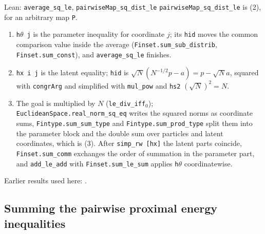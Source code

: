 \documentclass[11pt,a4paper]{report}
\begin{document}
\begin{leanbox}{Lean: \texttt{average\_\allowbreak{}sq\_\allowbreak{}le}, \texttt{pairwiseMap\_\allowbreak{}sq\_\allowbreak{}dist\_\allowbreak{}le}}
\texttt{pairwise\allowbreak{}Map\_\allowbreak{}sq\_\allowbreak{}dist\_\allowbreak{}le} is (2), for an arbitrary map \texttt{P}.



\begin{enumerate}


\item \texttt{h\ensuremath{\theta} j} is the parameter inequality for coordinate \(j\); its \texttt{hid} moves the common comparison value inside the average (\texttt{Finset.\allowbreak{}sum\_\allowbreak{}sub\_\allowbreak{}distrib}, \texttt{Finset.\allowbreak{}sum\_\allowbreak{}const}), and \texttt{average\_\allowbreak{}sq\_\allowbreak{}le} finishes.

\item \texttt{hx i j} is the latent equality; \texttt{hid} is \(\sqrt N(N^{-1/2}p-a)=p-\sqrt Na\), squared with \texttt{congr\allowbreak{}Arg} and simplified with \texttt{mul\_\allowbreak{}pow} and \texttt{hs2} \((\sqrt N)^2=N\).

\item The goal is multiplied by \(N\) (\texttt{le\_\allowbreak{}div\_\allowbreak{}iff\ensuremath{{}_{0}}}); \texttt{Euclidean\allowbreak{}Space.\allowbreak{}real\_\allowbreak{}norm\_\allowbreak{}sq\_\allowbreak{}eq} writes the squared norms as coordinate sums, \texttt{Fintype.\allowbreak{}sum\_\allowbreak{}sum\_\allowbreak{}type} and \texttt{Fintype.\allowbreak{}sum\_\allowbreak{}prod\_\allowbreak{}type} split them into the parameter block and the double sum over particles and latent coordinates, which is (3). After \texttt{simp\_\allowbreak{}rw [hx]} the latent parts coincide, \texttt{Finset.\allowbreak{}sum\_\allowbreak{}comm} exchanges the order of summation in the parameter part, and \texttt{add\_\allowbreak{}le\_\allowbreak{}add} with \texttt{Finset.\allowbreak{}sum\_\allowbreak{}le\_\allowbreak{}sum} applies \texttt{h\ensuremath{\theta}} coordinatewise.

\end{enumerate}
\end{leanbox}


Earlier results used here: \cite[Section~3.1.1]{LangevinLean2026IPLA}.
\subsection{\texorpdfstring{Summing the pairwise proximal energy inequalities}{Summing the pairwise proximal energy inequalities}}
\label{report-step-ProximalLangevin-ParticleEnergy-lean-2}
\end{document}
